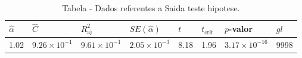 \begin{table}[H]
\centering
\caption{Tabela - Dados referentes a Saida teste hipotese.}
\label{tab:saida_teste_hipotese}
\begin{tabular}{llllllll}
\toprule
$\hat{\alpha}$ & $\hat{C}$ & $R^2_{\mathrm{aj}}$ & $SE(\hat{\alpha})$ & $t$ & $t_{\mathrm{crit}}$ & $p$-valor & $gl$ \\
\midrule
1.02 & $\displaystyle 9.26 \times 10^{-1}$ & $\displaystyle 9.61 \times 10^{-1}$ & $\displaystyle 2.05 \times 10^{-3}$ & 8.18 & 1.96 & $\displaystyle 3.17 \times 10^{-16}$ & 9998 \\
\bottomrule
\end{tabular}

\end{table}

